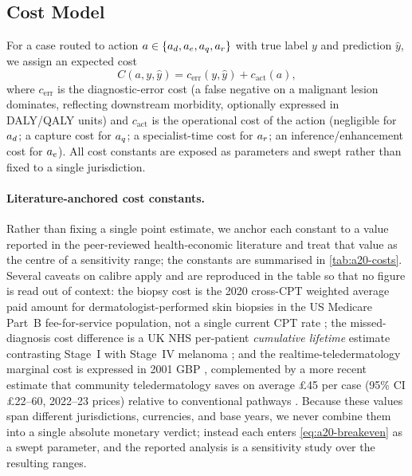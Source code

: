\subsection{Cost Model}\label{app:a20-model}
For a case routed to action $a\in\{a_d,a_e,a_q,a_r\}$ with true label $y$ and prediction
$\hat{y}$, we assign an expected cost
\begin{equation}
C(a,y,\hat{y}) = c_{\mathrm{err}}(y,\hat{y}) + c_{\mathrm{act}}(a),
\label{eq:a20-cost}
\end{equation}
where $c_{\mathrm{err}}$ is the diagnostic-error cost (a false negative on a malignant lesion
dominates, reflecting downstream morbidity, optionally expressed in DALY/QALY units) and
$c_{\mathrm{act}}$ is the operational cost of the action (negligible for $a_d$; a capture cost for
$a_q$; a specialist-time cost for $a_r$; an inference/enhancement cost for $a_e$). All cost
constants are exposed as parameters and swept rather than fixed to a single jurisdiction.

\paragraph{Literature-anchored cost constants.}
Rather than fixing a single point estimate, we anchor each constant to a value reported in the
peer-reviewed health-economic literature and treat that value as the centre of a sensitivity range; the
constants are summarised in \cref{tab:a20-costs}. Several caveats on calibre apply and are reproduced
in the table so that no figure is read out of context: the biopsy cost is the 2020 cross-CPT weighted
average paid amount for dermatologist-performed skin biopsies in the US Medicare Part~B
fee-for-service population, not a single current CPT rate \citep{li2023skinbiopsy}; the missed-diagnosis
cost difference is a UK NHS per-patient \emph{cumulative lifetime} estimate contrasting Stage~I with
Stage~IV melanoma \citep{mistry2026melanomacost}; and the realtime-teledermatology marginal cost is
expressed in 2001 GBP \citep{loane2001teledermatology}, complemented by a more recent estimate that
community teledermatology saves on average \pounds45 per case (95\% CI \pounds22--60, 2022--23 prices)
relative to conventional pathways \citep{hoogenboom2026teledermatology}. Because these values span
different jurisdictions, currencies, and base years, we never combine them into a single absolute
monetary verdict; instead each enters \cref{eq:a20-breakeven} as a swept parameter, and the reported
analysis is a sensitivity study over the resulting ranges.

